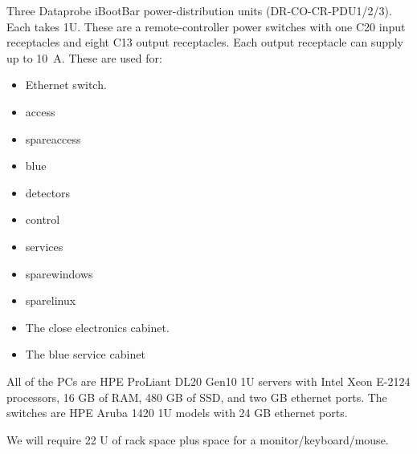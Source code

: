 \documentclass{article}
\begin{document}
\begin{itemize}
Three Dataprobe iBootBar power-distribution units (DR-CO-CR-PDU1/2/3). Each takes 1U. These are a remote-controller power switches with one C20 input receptacles and eight C13 output receptacles.
Each output receptacle can supply up to 10~A.
These are used for:
\begin{itemize}
\item Ethernet switch.
\item access
\item spareaccess
\item blue
\item detectors
\item control
\item services
\item sparewindows
\item sparelinux
\item The close electronics cabinet.
\item The blue service cabinet
\end{itemize}
\end{itemize}

All of the PCs are HPE ProLiant DL20 Gen10 1U servers with Intel Xeon E-2124 processors, 16 GB of RAM, 480 GB of SSD, and two GB ethernet ports. The switches are HPE Aruba 1420 1U models with 24 GB ethernet ports.



We will require 22 U of rack space plus space for a monitor/keyboard/mouse. 

\end{document}

